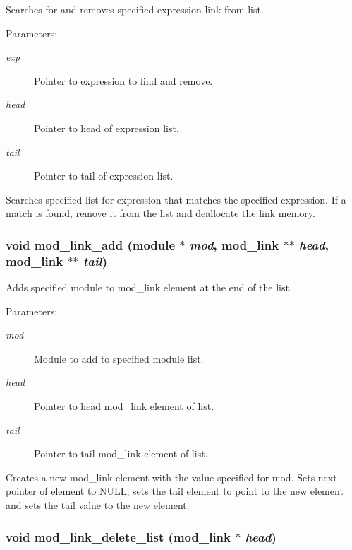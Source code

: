 Searches for and removes specified expression link from list.

\begin{Desc}
\item[Parameters: ]\par
\begin{description}
\item[{\em 
exp}]Pointer to expression to find and remove. \item[{\em 
head}]Pointer to head of expression list. \item[{\em 
tail}]Pointer to tail of expression list.\end{description}
\end{Desc}
Searches specified list for expression that matches the specified expression. If a match is found, remove it from the list and deallocate the link memory. 
\subsubsection{\setlength{\rightskip}{0pt plus 5cm}void mod\_\-link\_\-add ({\bf module} $\ast$ {\em mod}, {\bf mod\_\-link} $\ast$$\ast$ {\em head}, {\bf mod\_\-link} $\ast$$\ast$ {\em tail})}\label{link_8c_a5}


Adds specified module to mod\_\-link element at the end of the list.

\begin{Desc}
\item[Parameters: ]\par
\begin{description}
\item[{\em 
mod}]Module to add to specified module list. \item[{\em 
head}]Pointer to head mod\_\-link element of list. \item[{\em 
tail}]Pointer to tail mod\_\-link element of list.\end{description}
\end{Desc}
Creates a new mod\_\-link element with the value specified for mod. Sets next pointer of element to NULL, sets the tail element to point to the new element and sets the tail value to the new element. 
\subsubsection{\setlength{\rightskip}{0pt plus 5cm}void mod\_\-link\_\-delete\_\-list ({\bf mod\_\-link} $\ast$ {\em head})}\label{link_8c_a21}


